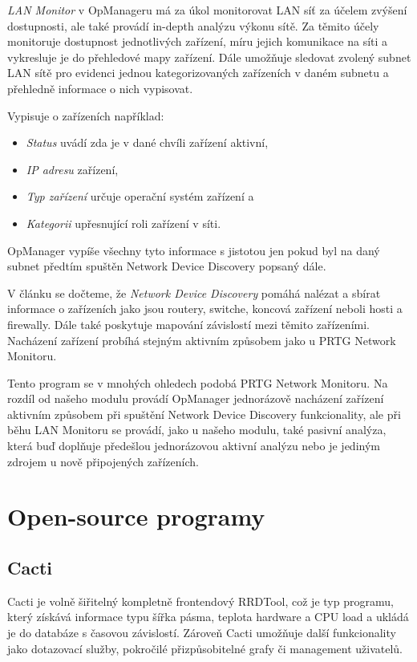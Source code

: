 \documentclass[thesis=B,czech,hidelinks]{FITthesis}[2019/03/21]
\begin{document}
        \emph{LAN Monitor} \cite{OpManagerLAN} v OpManageru má za úkol monitorovat LAN síť za účelem zvýšení dostupnosti, ale také provádí in-depth analýzu výkonu sítě. Za těmito účely monitoruje dostupnost jednotlivých zařízení, míru jejich komunikace na síti a vykresluje je do přehledové mapy zařízení. Dále umožňuje sledovat zvolený subnet LAN sítě pro evidenci jednou kategorizovaných zařízeních v daném subnetu a přehledně informace o nich vypisovat. 
        
        Vypisuje o zařízeních například: 
        \begin{itemize}
            \item\emph{Status}  uvádí zda je v dané chvíli zařízení aktivní,
            \item\emph{IP adresu}  zařízení,
            \item\emph{Typ zařízení}  určuje operační systém zařízení a
            \item\emph{Kategorii}  upřesnující roli zařízení v síti.
        \end{itemize}
        OpManager vypíše všechny tyto informace s jistotou jen pokud byl na daný subnet předtím spuštěn Network Device Discovery popsaný dále. 
        
        V článku \cite{OpManagerNDD} se dočteme, že \emph{Network Device Discovery} pomáhá nalézat a sbírat informace o zařízeních jako jsou routery, switche, koncová zařízení neboli hosti a firewally. Dále také poskytuje mapování závislostí mezi těmito zařízeními. Nacházení zařízení probíhá stejným aktivním způsobem jako u PRTG Network Monitoru. 
        
        Tento program se v mnohých ohledech podobá PRTG Network Monitoru. Na rozdíl od našeho modulu provádí OpManager jednorázově nacházení zařízení aktivním způsobem při spuštění Network Device Discovery funkcionality, ale při běhu LAN Monitoru se provádí, jako u našeho modulu, také pasivní analýza, která buď doplňuje předešlou jednorázovou aktivní analýzu nebo je jediným zdrojem u nově připojených zařízeních.
    \section{Open-source programy}
    
        \subsection{Cacti}
        Cacti \cite{Cacti} je volně šiřitelný kompletně frontendový RRDTool, což je typ programu, který získává informace typu šířka pásma, teplota hardware a CPU load a ukládá je do databáze s časovou závislostí. Zároveň Cacti umožňuje další funkcionality jako dotazovací služby, pokročilé přizpůsobitelné grafy či management uživatelů. 
        
\end{document}
